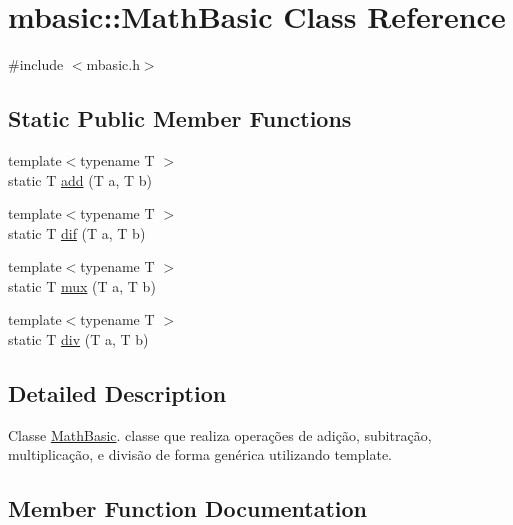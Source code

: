\hypertarget{classmbasic_1_1MathBasic}{}\section{mbasic\+:\+:Math\+Basic Class Reference}
\label{classmbasic_1_1MathBasic}


{\ttfamily \#include $<$mbasic.\+h$>$}

\subsection*{Static Public Member Functions}
\begin{DoxyCompactItemize}
\item 
{\footnotesize template$<$typename T $>$ }\\static T \hyperlink{classmbasic_1_1MathBasic_adac56e3331244699b35b11769f548cef}{add} (T a, T b)
\item 
{\footnotesize template$<$typename T $>$ }\\static T \hyperlink{classmbasic_1_1MathBasic_a8e4fc1aeb5b39aad18a5753577f79aba}{dif} (T a, T b)
\item 
{\footnotesize template$<$typename T $>$ }\\static T \hyperlink{classmbasic_1_1MathBasic_a592bea5152d67298a2d60b4438fc9357}{mux} (T a, T b)
\item 
{\footnotesize template$<$typename T $>$ }\\static T \hyperlink{classmbasic_1_1MathBasic_a855d9d4ef811aa9ca166e5040591cdc6}{div} (T a, T b)
\end{DoxyCompactItemize}


\subsection{Detailed Description}
Classe \hyperlink{classmbasic_1_1MathBasic}{Math\+Basic}. classe que realiza operações de adição, subitração, multiplicação, e divisão de forma genérica utilizando template. 

\subsection{Member Function Documentation}
\mbox{\label{classmbasic_1_1MathBasic_adac56e3331244699b35b11769f548cef}} 
